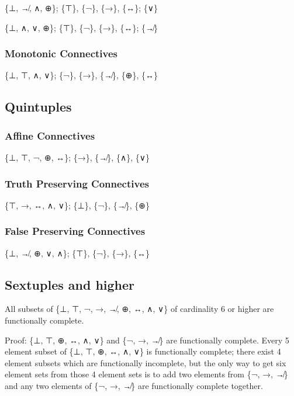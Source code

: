 \{⊥, ↛, ∧, ⊕\}; \{⊤\}, \{¬\}, \{→\}, \{↔\}; \{∨\}

\{⊥, ∧, ∨, ⊕\}; \{⊤\}, \{¬\}, \{→\}, \{↔\}; \{↛\}

\hypertarget{monotonic-connectives}{%
\subsubsection{\texorpdfstring{Monotonic Connectives
}{Monotonic Connectives }}\label{monotonic-connectives}}

\{⊥, ⊤, ∧, ∨\}; \{¬\}, \{→\}, \{↛\}, \{⊕\}, \{↔\}

\hypertarget{quintuples}{%
\subsection{Quintuples}\label{quintuples}}

\hypertarget{affine-connectives-2}{%
\subsubsection{Affine Connectives}\label{affine-connectives-2}}

\{⊥, ⊤, ¬, ⊕, ↔\}; \{→\}, \{↛\}, \{∧\}, \{∨\}

\hypertarget{truth-preserving-connectives-2}{%
\subsubsection{Truth Preserving
Connectives}\label{truth-preserving-connectives-2}}

\{⊤, →, ↔, ∧, ∨\}; \{⊥\}, \{¬\}, \{↛\}, \{⊕\}

\hypertarget{false-preserving-connectives-2}{%
\subsubsection{False Preserving
Connectives}\label{false-preserving-connectives-2}}

\{⊥, ↛, ⊕, ∨, ∧\}; \{⊤\}, \{¬\}, \{→\}, \{↔\}

\hypertarget{sextuples-and-higher}{%
\subsection{Sextuples and higher}\label{sextuples-and-higher}}

All subsets of \{⊥, ⊤, ¬, →, ↛, ⊕, ↔, ∧, ∨\} of cardinality 6 or higher
are functionally complete.

Proof: \{⊥, ⊤, ⊕, ↔, ∧, ∨\} and \{¬, →, ↛\} are functionally complete.
Every 5 element subset of \{⊥, ⊤, ⊕, ↔, ∧, ∨\} is functionally complete;
there exist 4 element subsets which are functionally incomplete, but the
only way to get six element sets from those 4 element sets is to add two
elements from \{¬, →, ↛\} and any two elements of \{¬, →, ↛\} are
functionally complete together.

